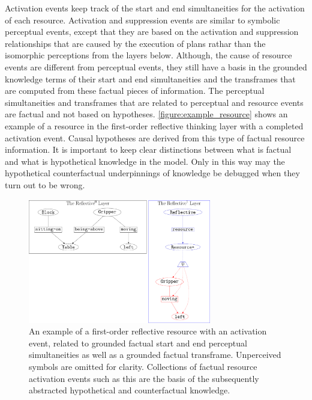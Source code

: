 Activation events keep track of the start and end simultaneities for
the activation of each resource.  Activation and suppression events
are similar to symbolic perceptual events, except that they are based
on the activation and suppression relationships that are caused by the
execution of plans rathar than the isomorphic perceptions from the
layers below.  Although, the cause of resource events are different
from perceptual events, they still have a basis in the grounded
knowledge terms of their start and end simultaneities and the
transframes that are computed from these factual pieces of
information.  The perceptual simultaneities and transframes that are
related to perceptual and resource events are factual and not based on
hypotheses.  {\mbox{\autoref{figure:example_resource}}} shows an
example of a resource in the first-order reflective thinking layer
with a completed activation event.  Causal hypotheses are derived from
this type of factual resource information.  It is important to keep
clear distinctions between what is factual and what is hypothetical
knowledge in the model.  Only in this way may the hypothetical
counterfactual underpinnings of knowledge be debugged when they turn
out to be wrong.
\begin{figure}
\center
\includegraphics[width=8cm]{gfx/example_resource}
\caption[An example of a first-order reflective resource with an
  activation event.]{An example of a first-order reflective resource
  with an activation event, related to grounded factual start and end
  perceptual simultaneities as well as a grounded factual transframe.
  Unperceived symbols are omitted for clarity.  Collections of factual
  resource activation events such as this are the basis of the
  subsequently abstracted hypothetical and counterfactual knowledge.}
\label{figure:example_resource}
\end{figure}

